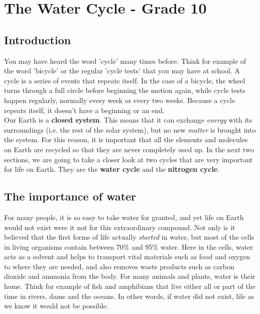 \chapter{The Water Cycle - Grade 10}
\label{c:watercycle}




\section{Introduction}

You may have heard the word 'cycle' many times before. Think for example of the word 'bicycle' or the regular 'cycle tests' that you may have at school. A cycle is a series of events that repeats itself. In the case of a bicycle, the wheel turns through a full circle before beginning the motion again, while cycle tests happen regularly, normally every week or every two weeks. Because a cycle repeats itself, it doesn't have a beginning or an end.\\

Our Earth is a \textbf{closed system}. This means that it can exchange \textit{energy} with its surroundings (i.e. the rest of the solar system), but no new \textit{matter} is brought into the system. For this reason, it is important that all the elements and molecules on Earth are recycled so that they are never completely used up. In the next two sections, we are going to take a closer look at two cycles that are very important for life on Earth. They are the \textbf{water cycle} and the \textbf{nitrogen cycle}.






\section{The importance of water}

For many people, it is so easy to take water for granted, and yet life on Earth would not exist were it not for this extraordinary compound. Not only is it believed that the first forms of life actually \textit{started} in water, but most of the cells in living organisms contain between 70\% and 95\% water. Here in the cells, water acts as a solvent and helps to transport vital materials such as food and oxygen to where they are needed, and also removes waste products such as carbon dioxide and ammonia from the body. For many animals and plants, water is their home. Think for example of fish and amphibians that live either all or part of the time in rivers, dams and the oceans. In other words, if water did not exist, life as we know it would not be possible.\\

